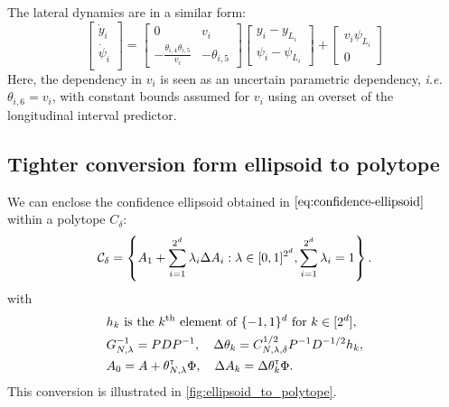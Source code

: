 \documentclass{article}
\begin{document}
The lateral dynamics are in a similar form:
\begin{equation*}
\begin{bmatrix}
\dot{y}_i \\
\dot{\psi}_i \\
\end{bmatrix}
=
\begin{bmatrix}
0 & v_i \\
-\frac{\theta_{i,4} \theta_{i,5}}{v_i} & -\theta_{i,5}
\end{bmatrix}
\begin{bmatrix}
y_i - y_{L_i} \\
\psi_i - \psi_{L_i}
\end{bmatrix}
+
\begin{bmatrix}
v_i\psi_{L_i} \\
0
\end{bmatrix}
\end{equation*}
Here, the dependency in $v_i$ is seen as an uncertain parametric dependency, \emph{i.e.} $\theta_{i,6}=v_i$, with constant bounds assumed for $v_i$ using an overset of the longitudinal interval predictor.

\subsection{Tighter conversion form ellipsoid to polytope}
\label{sec:tight-polytope}
\begin{lemma}
\label{lem:tight_polytope}
We can enclose the confidence ellipsoid obtained in $\eqref{eq:confidence-ellipsoid}$ within a polytope $C_\delta$:
\begin{equation}
     \mathcal{C}_\delta = \left\{ A_{1}+\sum_{i=1}^{2^d}\lambda_{i}\Delta A_{i}: \lambda\in[0, 1]^{2^d},  \sum_{i=1}^{2^d}\lambda_{i}=1\right\}.
\end{equation}
with 
\begin{align*}
    &h_k \text{ is the }k^\text{th}\text{ element of }\{-1,1\}^d\text{ for } k\in[2^d],\\
    &G_{N,\lambda}^{-1} = PDP^{-1}, \quad \Delta\theta_k = C_{N,\lambda,\delta}^{1/2} P^{-1}D^{-1/2} h_k, \\
    &A_0 = A + \theta_{N,\lambda}^{\mathsf{\scriptscriptstyle T}}\Phi, \quad \Delta A_k = \Delta\theta_k^{\mathsf{\scriptscriptstyle T}}\Phi.
\end{align*}
This conversion is illustrated in \autoref{fig:ellipsoid_to_polytope}.
\end{lemma}
\end{document}
